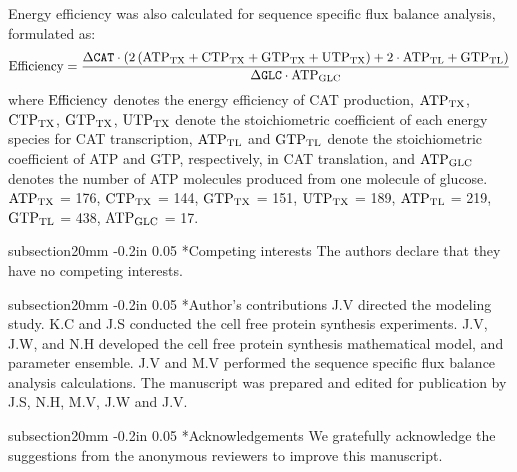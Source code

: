 \documentclass[12pt]{article}
\makeatletter
\renewcommand\section{\@startsection
	{subsection}{2}{0mm}
	{-0.2in}
	{0.05\baselineskip}
	{\normalfont\large\bfseries}}
\makeatother
\begin{document}
Energy efficiency was also calculated for sequence specific flux balance analysis, formulated as:
\begin{equation}\label{eqn:energy-efficiency-definition}
	\rm Efficiency=\frac{\Delta\texttt{CAT}\cdot \left(2\left({ATP}_{TX}+\rm {CTP}_{TX}+\rm {GTP}_{TX}+\rm {UTP}_{TX}\right)+\rm2\cdot\rm {ATP}_{TL}+\rm {GTP}_{TL}\right)}{\Delta\texttt{GLC}\cdot \rm {ATP}_{GLC}}
\end{equation}
where $\rm Efficiency$ denotes the energy efficiency of CAT production, $\rm {ATP}_{TX}$, $\rm {CTP}_{TX}$, $\rm {GTP}_{TX}$, $\rm {UTP}_{TX}$ denote the stoichiometric coefficient of each energy species for CAT transcription, $\rm {ATP}_{TL}$ and $\rm {GTP}_{TL}$ denote the stoichiometric coefficient of ATP and GTP, respectively, in CAT translation, and $\rm {ATP}_{GLC}$ denotes the number of ATP molecules produced from one molecule of glucose.
$\rm {ATP}_{TX}$ = 176, $\rm {CTP}_{TX}$ = 144, $\rm {GTP}_{TX}$ = 151, $\rm {UTP}_{TX}$ = 189, $\rm {ATP}_{TL}$ = 219, $\rm {GTP}_{TL}$ = 438, $\rm {ATP}_{GLC}$ = 17.


\clearpage

\section*{Competing interests}
The authors declare that they have no competing interests.

\section*{Author's contributions}
J.V directed the modeling study.
K.C and J.S conducted the cell free protein synthesis experiments.
J.V, J.W, and N.H developed the cell free protein synthesis mathematical model, and parameter ensemble.
J.V and M.V performed the sequence specific flux balance analysis calculations.
The manuscript was prepared and edited for publication by J.S, N.H, M.V, J.W and J.V.

\section*{Acknowledgements}
We gratefully acknowledge the suggestions from the anonymous reviewers to improve this manuscript.
\end{document}
